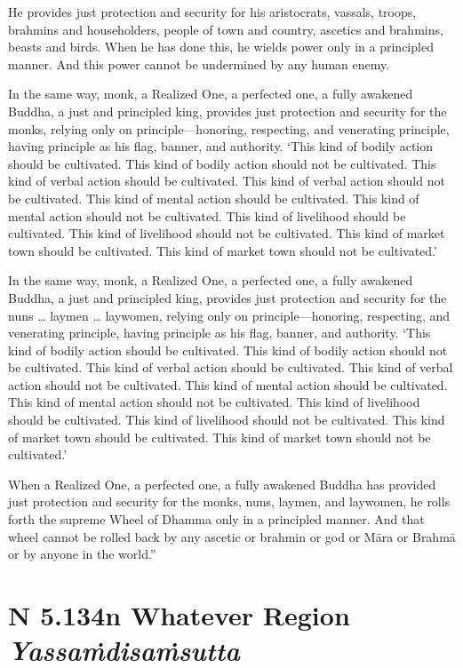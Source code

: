 \documentclass[12pt,openany]{book}%
\newcommand*{\suttatitleacronym}[1]{\smaller[2]{#1}\vspace*{.3em}}
\newcommand*{\suttatitletranslation}[1]{\linebreak{#1}}
\newcommand*{\suttatitleroot}[1]{\linebreak\smaller[2]\itshape{#1}}
\newcommand*{\tocacronym}[1]{\hspace*{-3.3em}{#1}\quad}
\newcommand*{\toctranslation}[1]{#1}
\newcommand*{\tocroot}[1]{(\textit{#1})}
\begin{document}
He provides just protection and security for his aristocrats, vassals, troops, brahmins and householders, people of town and country, ascetics and brahmins, beasts and birds. When he has done this, he wields power only in a principled manner. And this power cannot be undermined by any human enemy. 

In the same way, monk, a Realized One, a perfected one, a fully awakened Buddha, a just and principled king, provides just protection and security for the monks, relying only on principle—honoring, respecting, and venerating principle, having principle as his flag, banner, and authority. ‘This kind of bodily action should be cultivated. This kind of bodily action should not be cultivated. This kind of verbal action should be cultivated. This kind of verbal action should not be cultivated. This kind of mental action should be cultivated. This kind of mental action should not be cultivated. This kind of livelihood should be cultivated. This kind of livelihood should not be cultivated. This kind of market town should be cultivated. This kind of market town should not be cultivated.’ 

In the same way, monk, a Realized One, a perfected one, a fully awakened Buddha, a just and principled king, provides just protection and security for the nuns … laymen … laywomen, relying only on principle—honoring, respecting, and venerating principle, having principle as his flag, banner, and authority. ‘This kind of bodily action should be cultivated. This kind of bodily action should not be cultivated. This kind of verbal action should be cultivated. This kind of verbal action should not be cultivated. This kind of mental action should be cultivated. This kind of mental action should not be cultivated. This kind of livelihood should be cultivated. This kind of livelihood should not be cultivated. This kind of market town should be cultivated. This kind of market town should not be cultivated.’ 

When a Realized One, a perfected one, a fully awakened Buddha has provided just protection and security for the monks, nuns, laymen, and laywomen, he rolls forth the supreme Wheel of Dhamma only in a principled manner. And that wheel cannot be rolled back by any ascetic or brahmin or god or \textsanskrit{Māra} or \textsanskrit{Brahmā} or by anyone in the world.” 

%
\section*{{\suttatitleacronym AN 5.134}{\suttatitletranslation In Whatever Region }{\suttatitleroot Yassaṁdisaṁsutta}}
\addcontentsline{toc}{section}{\tocacronym{AN 5.134} \toctranslation{In Whatever Region } \tocroot{Yassaṁdisaṁsutta}}
\end{document}
